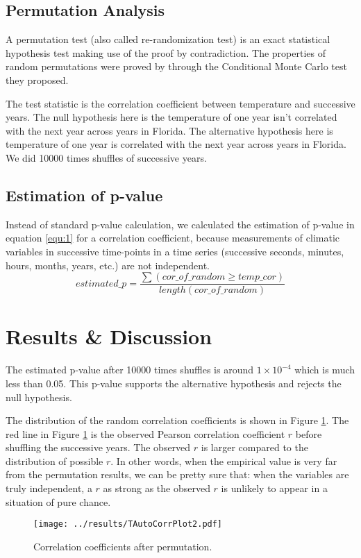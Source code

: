 \documentclass[12pt]{article}
\begin{document}
 \subsection{Permutation Analysis}
 A permutation test (also called re-randomization test) is an exact statistical hypothesis test making use of the proof by contradiction. The properties of random permutations were proved by \cite{hemerik_exact_2018} through the Conditional Monte Carlo test they proposed.\par
 \vspace{5mm}
 The test statistic is the correlation coefficient between temperature and successive years. The null hypothesis here is the temperature of one year isn't correlated with the next year across years in Florida. The alternative hypothesis here is temperature of one year is correlated with the next year across years in Florida. We did 10000 times shuffles of successive years. 
 \subsection{Estimation of p-value}
 Instead of standard p-value calculation, we calculated the estimation of p-value in equation \ref{equ:1} for a correlation coefficient, because measurements of climatic variables in successive time-points in a time series (successive seconds, minutes, hours, months, years, etc.) are not independent.
 \begin{equation}\label{equ:1}
  estimated\_p = \frac{\sum{(cor\_of\_random \ge temp\_cor)}}{length(cor\_of\_random)}
 \end{equation}
 \section{Results \& Discussion}
 The estimated p-value after 10000 times shuffles is around $1 \times 10 ^{-4}$ which is much less than 0.05. This p-value supports the alternative hypothesis and rejects the null hypothesis.\par
 \vspace{5mm}
 \noindent The distribution of the random correlation coefficients is shown in Figure \ref{fig:2}. The red line in Figure \ref{fig:2} is the observed Pearson correlation coefficient $r$ before shuffling the successive years. The observed $r$ is larger compared to the distribution of possible $r$. In other words, when the empirical value is very far from the permutation results, we can be pretty sure that: when the variables are truly independent, a $r$ as strong as the observed $r$ is unlikely to appear in a situation of pure chance. \par
 \vspace{5mm}
 \begin{figure}[htb]
  \texttt{[image: ../results/TAutoCorrPlot2.pdf]}
  \caption{Correlation coefficients after permutation.}
  \label{fig:2}
 \end{figure}


  \clearpage
  

  
\end{document}
